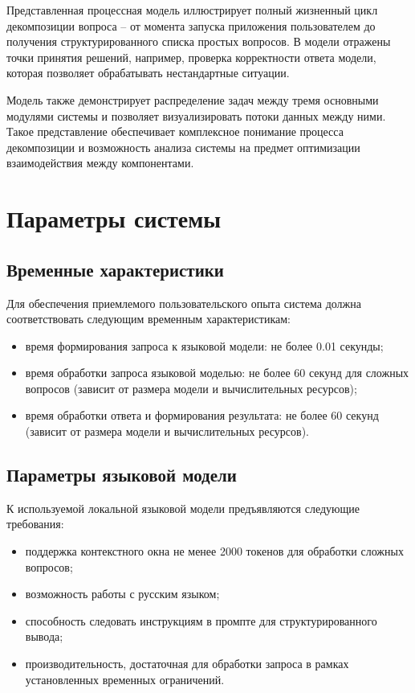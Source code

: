 Представленная процессная модель иллюстрирует полный жизненный цикл декомпозиции вопроса -- от момента запуска приложения пользователем до получения структурированного списка простых вопросов. В модели отражены точки принятия решений, например, проверка корректности ответа модели, которая позволяет обрабатывать нестандартные ситуации.

Модель также демонстрирует распределение задач между тремя основными модулями системы и позволяет визуализировать потоки данных между ними. Такое представление обеспечивает комплексное понимание процесса декомпозиции и возможность анализа системы на предмет оптимизации взаимодействия между компонентами.

\section{Параметры системы}

\subsection{Временные характеристики}

Для обеспечения приемлемого пользовательского опыта система должна соответствовать следующим временным характеристикам:
\begin{itemize}
	\item время формирования запроса к языковой модели: не более 0.01 секунды;
	\item время обработки запроса языковой моделью: не более 60 секунд для сложных вопросов (зависит от размера модели и вычислительных ресурсов);
	\item время обработки ответа и формирования результата: не более 60 секунд (зависит от размера модели и вычислительных ресурсов).
\end{itemize}

\subsection{Параметры языковой модели}

К используемой локальной языковой модели предъявляются следующие требования:
\begin{itemize}
	\item поддержка контекстного окна не менее 2000 токенов для обработки сложных вопросов;
	\item возможность работы с русским языком;
	\item способность следовать инструкциям в промпте для структурированного вывода;
	\item производительность, достаточная для обработки запроса в рамках установленных временных ограничений.
\end{itemize}

